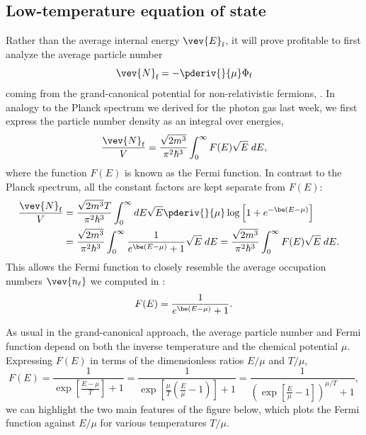\subsection{Low-temperature equation of state}
Rather than the average internal energy $\vev{E}_{\text{f}}$, it will prove profitable to first analyze the average particle number
\begin{equation*}
  \vev{N}_{\text{f}} = -\pderiv{}{\mu} \Phi_{\text{f}}
\end{equation*}
coming from the grand-canonical potential for non-relativistic fermions, .
In analogy to the Planck spectrum we derived for the photon gas last week, we first express the particle number density as an integral over energies,
\begin{equation*}
  \frac{\vev{N}_{\text{f}}}{V} = \frac{\sqrt{2m^3}}{\pi^2 \hbar^3} \int_0^{\infty} F(E) \sqrt{E} \; dE,
\end{equation*}
where the function $F(E)$ is known as the Fermi function.
In contrast to the Planck spectrum, all the constant factors are kept separate from $F(E)$:
\begin{align}
  \frac{\vev{N}_{\text{f}}}{V} & = \frac{\sqrt{2m^3} T}{\pi^2 \hbar^3} \int_0^{\infty} dE \sqrt{E} \pderiv{}{\mu} \log\left[1 + e^{-\be(E - \mu)}\right] \cr
                               & = \frac{\sqrt{2m^3}}{\pi^2 \hbar^3} \int_0^{\infty} \frac{1}{e^{\be(E - \mu)} + 1} \sqrt{E} \; dE = \frac{\sqrt{2m^3}}{\pi^2 \hbar^3} \int_0^{\infty} F(E) \sqrt{E} \; dE. \label{eq:N_fermi}
\end{align}
This allows the Fermi function to closely resemble the average occupation numbers $\vev{n_{\ell}}$ we computed in :
\begin{equation}
  \label{eq:Fermi_func}
  F(E) = \frac{1}{e^{\be(E - \mu)} + 1}.
\end{equation}

As usual in the grand-canonical approach, the average particle number and Fermi function depend on both the inverse temperature \be and the chemical potential $\mu$.
Expressing $F(E)$ in terms of the dimensionless ratios $E / \mu$ and $T / \mu$,
\begin{equation*}
  F(E) = \frac{1}{\exp\left[\frac{E - \mu}{T}\right] + 1} = \frac{1}{\exp\left[\frac{\mu}{T}\left(\frac{E}{\mu} - 1\right)\right] + 1} = \frac{1}{\left(\exp\left[\frac{E}{\mu} - 1\right]\right)^{\mu / T} + 1},
\end{equation*}
we can highlight the two main features of the figure below, which plots the Fermi function against $E / \mu$ for various temperatures $T / \mu$.

